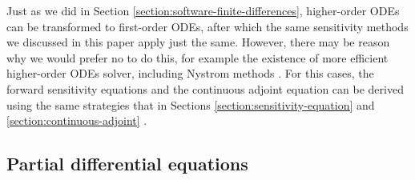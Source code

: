 Just as we did in Section \ref{section:software-finite-differences}, higher-order ODEs can be transformed to first-order ODEs, after which the same sensitivity methods we discussed in this paper apply just the same. 
However, there may be reason why we would prefer no to do this, for example the existence of more efficient higher-order ODEs solver, including Nystrom methods \cite{Butcher_Wanner_1996, hairer-solving-1}. 
For this cases, the forward sensitivity equations and the continuous adjoint equation can be derived using the same strategies that in Sections \ref{section:sensitivity-equation} and \ref{section:continuous-adjoint} \cite{kang2006review}. 

\subsection{Partial differential equations}




